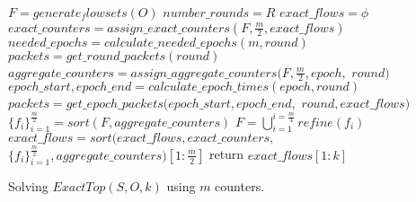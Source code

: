 \begin{algorithm}
    $F = generate_flowsets(O)$\;
    $number\_rounds=R$\;
    $exact\_flows=\phi$\;
    {
        $exact\_counters=assign\_exact\_counters(F, \frac{m}{2}, exact\_flows)$\;
        $needed\_epochs=calculate\_needed\_epochs(m, round)$\;
        $packets=get\_round\_packets(round)$\;
        {
            $aggregate\_counters=assign\_aggregate\_counters(F, \frac{m}{2}, epoch,$
            $    round)$\;
            $epoch\_start, epoch\_end=calculate\_epoch\_times(epoch, round)$\;
            $packets=get\_epoch\_packets(epoch\_start, epoch\_end,$
            $    round, exact\_flows)$\;
            $\{f_i\}^{\frac{m}{2}}_{i=1}=sort(F, aggregate\_counters)$\;
            $F=\bigcup_{i=1}^{i=\frac{m}{4}}refine(f_i)$\;
        }
        $exact\_flows=sort(exact\_flows, exact\_counters,$
         $\{f_i\}^{\frac{m}{2}}_{i=1}, aggregate\_counters)[1:\frac{m}{2}]$\;
    }
    return $exact\_flows[1:k]$\;
    \caption{Solving $ExactTop(S,O,k)$ using $m$ counters.}
    \label{algo:MultiRound}
\end{algorithm}
